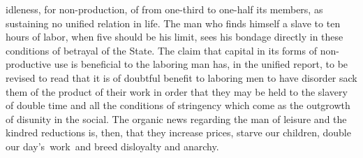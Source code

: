 \documentclass[openany,nobib]{tufte-book}
\begin{document}
idleness, for non-production, of from one-third to one-half its members,
as sustaining no unified relation in life. The man who finds himself a
slave to ten hours of labor, when five should be his limit, sees his
bondage directly in these conditions of betrayal of the State. The claim
that capital in its forms of non-productive use is beneficial to the
laboring man has, in the unified report, to be revised to read that it
is of doubtful benefit to laboring men to have disorder sack them of the
product of their work in order that they may be held to the slavery of
double time and all the conditions of stringency which come as the
outgrowth of disunity in the social. The organic news regarding the man
of leisure and the kindred reductions is, then, that they increase
prices, starve our children, double our day's~work~and breed disloyalty
and anarchy.~
\end{document}
